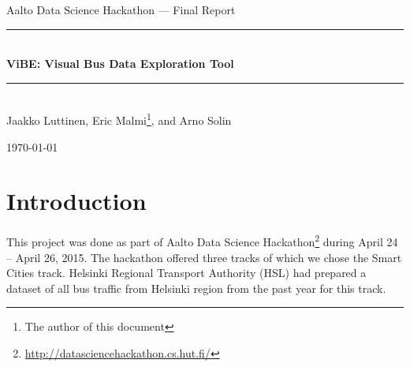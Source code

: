 \documentclass[a4paper,12pt]{article}
\title{\reporttitle}
\author{\authorA}
\newcommand{\reporttitle}{ViBE: Visual Bus Data Exploration Tool}
\begin{document}

\setlength{\abovecaptionskip}{10pt}
\setlength{\belowcaptionskip}{10pt}
\renewcommand{\captionlabelfont}{\bf}
\newcommand{\eref}[1]{(\ref{#1})}
\newcommand{\HRule}{\rule{\linewidth}{0.5mm}}


\thispagestyle{empty}
\begin{center}

\noindent\Large{Aalto Data Science Hackathon --- Final Report}\\
\vspace*{0.5cm}
\HRule  \\
\vspace*{0.3cm}
\noindent\LARGE{\textbf{\reporttitle}}\\
\HRule  \\
\vspace*{1cm}
\noindent\Large{Jaakko Luttinen, Eric Malmi\footnote{The author of this 
document}, and Arno Solin}\\
\vspace*{1cm}

{\Large \today}

\vspace*{0.5cm}

\end{center}


\section{Introduction}

This project was done as part of Aalto Data Science 
Hackathon\footnote{\url{http://datasciencehackathon.cs.hut.fi/}} during April 
24 -- April 26, 2015. The hackathon offered three tracks of which we chose the 
Smart Cities track. Helsinki Regional Transport Authority (HSL) had 
prepared a dataset of all bus traffic from Helsinki region from the past year 
for this track.
\end{document}
